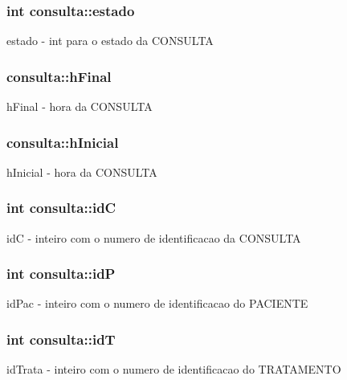\subsubsection[{estado}]{\setlength{\rightskip}{0pt plus 5cm}int consulta\+::estado}\label{structconsulta_af2020b18973b7f08dfca7b038efcb5bc}
estado -\/ int para o estado da C\+O\+N\+S\+U\+L\+T\+A 
\subsubsection[{h\+Final}]{ consulta\+::h\+Final}\label{structconsulta_a20347369648896d24bbd4ab194b48114}
h\+Final -\/ hora da C\+O\+N\+S\+U\+L\+T\+A 
\subsubsection[{h\+Inicial}]{ consulta\+::h\+Inicial}\label{structconsulta_aa34c77fd8b009491cb81c8f7c22fa29a}
h\+Inicial -\/ hora da C\+O\+N\+S\+U\+L\+T\+A 
\subsubsection[{id\+C}]{\setlength{\rightskip}{0pt plus 5cm}int consulta\+::id\+C}\label{structconsulta_ab4f332105a978a19dc099273e0293dd2}
id\+C -\/ inteiro com o numero de identificacao da C\+O\+N\+S\+U\+L\+T\+A 
\subsubsection[{id\+P}]{\setlength{\rightskip}{0pt plus 5cm}int consulta\+::id\+P}\label{structconsulta_a902a5263df2283dc61d660300a46bf12}
id\+Pac -\/ inteiro com o numero de identificacao do P\+A\+C\+I\+E\+N\+T\+E 
\subsubsection[{id\+T}]{\setlength{\rightskip}{0pt plus 5cm}int consulta\+::id\+T}\label{structconsulta_aff7cbae49fb2674619dc13db239f467e}
id\+Trata -\/ inteiro com o numero de identificacao do T\+R\+A\+T\+A\+M\+E\+N\+T\+O 
